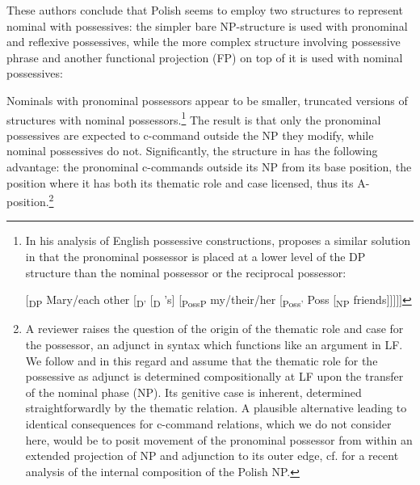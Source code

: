 \documentclass[output=paper,modfonts,nonflat
]{langsci/langscibook}
\begin{document}
\largerpage
\noindent These authors conclude that Polish seems to employ two structures to represent nominal with possessives: the simpler bare NP-structure is used with pronominal and reflexive possessives, while the more complex structure involving possessive phrase and another functional projection (FP) on top of it is used with nominal possessives:

\ea \label{ex:witkos:20}
	\z
\z
                        
\noindent Nominals with pronominal possessors appear to be smaller, truncated versions of structures with nominal possessors.\footnote{\label{fn16}In his analysis of English possessive constructions, \cite{despic2015} proposes a similar solution in that the pronominal possessor is placed at a lower level of the DP structure than the nominal possessor or the reciprocal possessor:

\ea
$[$\textsubscript{DP} Mary/each other [\textsubscript{D$’$} [\textsubscript{D} 's] [\textsubscript{PossP} my/their/her [\textsubscript{Poss$’$} Poss [\textsubscript{NP} friends$]]]]]$
\z} The result is that only the pronominal possessives are expected to c-command outside the NP they modify, while nominal possessives do not. Significantly, the structure in  has the following advantage: the pronominal c-commands outside its NP from its base position, the position where it has both its thematic role and case licensed, thus its A-position.\footnote{\label{fn17}A reviewer raises the question of the origin of the thematic role and case for the possessor, an adjunct in syntax which functions like an argument in LF. We follow \cite{boskovic2005locality,boskovic2012} and \cite{despic2011,despic2013,despic2015} in this regard and assume that the thematic role for the possessive as adjunct is determined compositionally at LF upon the transfer of the nominal phase (NP). Its genitive case is inherent, determined straightforwardly by the thematic relation. A plausible alternative leading to identical consequences for c-command relations, which we do not consider here, would be to posit movement of the pronominal possessor from within an extended projection of NP and adjunction to its outer edge, cf. \cite{ceglowski2017} for a recent analysis of the internal composition of the Polish NP.}
\end{document}

